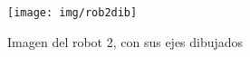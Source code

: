 \begin{figure}[h]
	\centering
	\texttt{[image: img/rob2dib]}
	\caption{Imagen del robot 2, con sus ejes dibujados}
	\label{fig:rob2dib}
\end{figure}